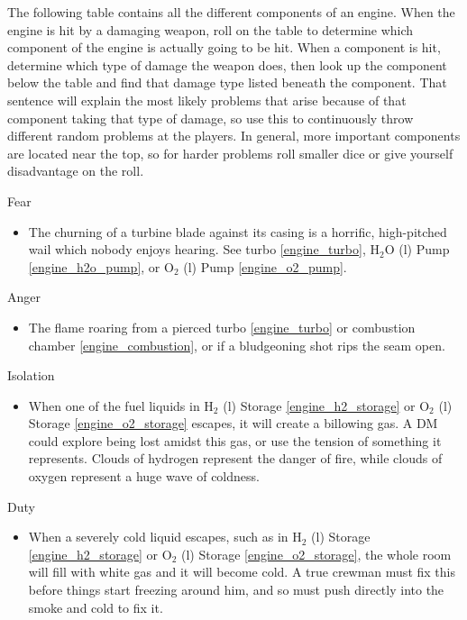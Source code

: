 \documentclass[a4paper]{article}
\begin{document}
The following table contains all the different components of an engine. When the engine is hit by a damaging weapon, roll on the table to determine which component of the engine is actually going to be hit. When a component is hit, determine which type of damage the weapon does, then look up the component below the table and find that damage type listed beneath the component. That sentence will explain the most likely problems that arise because of that component taking that type of damage, so use this to continuously throw different random problems at the players. In general, more important components are located near the top, so for harder problems roll smaller dice or give yourself disadvantage on the roll.

\vspace{0.3cm}
\begin{minipage}[t]{0.4\linewidth}
Fear
\begin{itemize}
\item The churning of a turbine blade against its casing is a horrific, high-pitched wail which nobody enjoys hearing. See turbo \ref{engine_turbo}, H$_2$O (l) Pump \ref{engine_h2o_pump}, or O$_2$ (l) Pump \ref{engine_o2_pump}.
\end{itemize}
\end{minipage} 
\begin{minipage}[t]{0.4\linewidth}
Anger
\begin{itemize}
\item The flame roaring from a pierced turbo \ref{engine_turbo} or combustion chamber \ref{engine_combustion}, or if a bludgeoning shot rips the seam open. 
\end{itemize}
\end{minipage}

\begin{minipage}[t]{0.4\linewidth}
Isolation
\begin{itemize}
\item When one of the fuel liquids in H$_2$ (l) Storage \ref{engine_h2_storage} or O$_2$ (l) Storage \ref{engine_o2_storage} escapes, it will create a billowing gas. A DM could explore being lost amidst this gas, or use the tension of something it represents. Clouds of hydrogen represent the danger of fire, while clouds of oxygen represent a huge wave of coldness. 
\end{itemize}
\end{minipage}
\begin{minipage}[t]{0.4\linewidth}
Duty
\begin{itemize}
\item When a severely cold liquid escapes, such as in H$_2$ (l) Storage \ref{engine_h2_storage} or O$_2$ (l) Storage \ref{engine_o2_storage}, the whole room will fill with white gas and it will become cold. A true crewman must fix this before things start freezing around him, and so must push directly into the smoke and cold to fix it.
\end{itemize}
\end{minipage}
 
\end{document}
